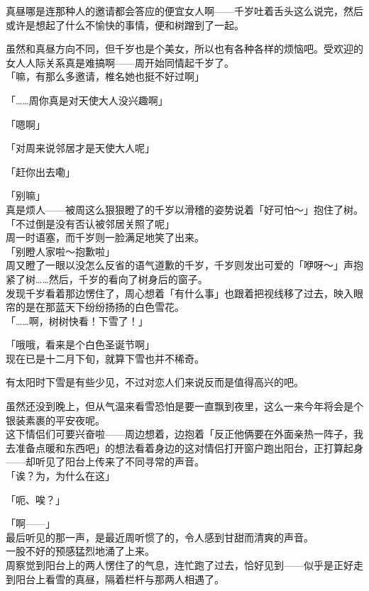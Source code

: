 真昼哪是连那种人的邀请都会答应的便宜女人啊——千岁吐着舌头这么说完，然后或许是想起了什么不愉快的事情，便和树蹭到了一起。

虽然和真昼方向不同，但千岁也是个美女，所以也有各种各样的烦恼吧。受欢迎的女人人际关系真是难搞啊——周开始同情起千岁了。\\

「嘛，有那么多邀请，椎名她也挺不好过啊」

「……周你真是对天使大人没兴趣啊」

「嗯啊」

「对周来说邻居才是天使大人呢」

「赶你出去嘞」

「别嘛」\\

真是烦人——被周这么狠狠瞪了的千岁以滑稽的姿势说着「好可怕～」抱住了树。\\

「不过倒是没有否认被邻居关照了呢」\\

周一时语塞，而千岁则一脸满足地笑了出来。\\

「别瞪人家啦～抱歉啦」\\

周又瞪了一眼以没怎么反省的语气道歉的千岁，千岁则发出可爱的「咿呀～」声抱紧了树……然后，千岁的看向了树身后的窗子。\\

发现千岁看着那边愣住了，周心想着「有什么事」也跟着把视线移了过去，映入眼帘的是在那蓝天下纷纷扬扬的白色雪花。\\

「……啊，树树快看！下雪了！」

「哦哦，看来是个白色圣诞节啊」\\

现在已是十二月下旬，就算下雪也并不稀奇。

有太阳时下雪是有些少见，不过对恋人们来说反而是值得高兴的吧。

虽然还没到晚上，但从气温来看雪恐怕是要一直飘到夜里，这么一来今年将会是个银装素裹的平安夜呢。\\

这下情侣们可要兴奋啦——周边想着，边抱着「反正他俩要在外面亲热一阵子，我去准备点暖和东西吧」的想法看着身边的这对情侣打开窗户跑出阳台，正打算起身——却听见了阳台上传来了不同寻常的声音。\\

「诶？为，为什么在这」

「呃、唉？」

「啊——」\\

最后听见的那一声，是最近周听惯了的，令人感到甘甜而清爽的声音。\\

一股不好的预感猛烈地涌了上来。\\

周察觉到阳台上的两人愣住了的气息，连忙跑了过去，恰好见到——似乎是正好走到阳台上看雪的真昼，隔着栏杆与那两人相遇了。\\
